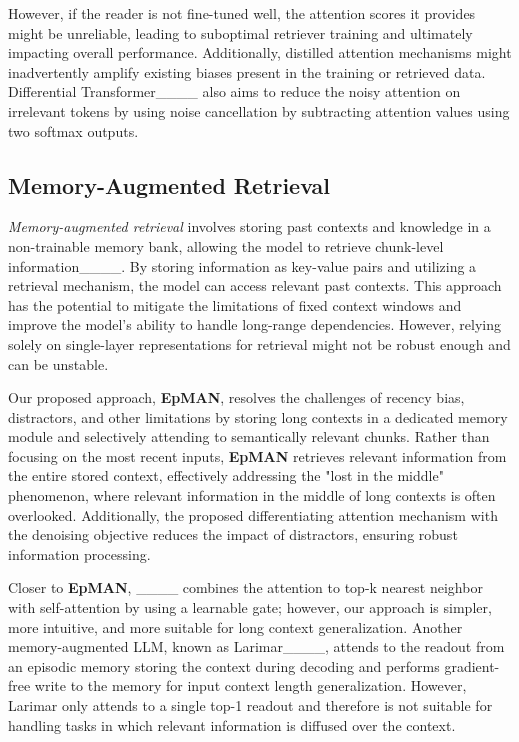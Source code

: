 However, if the reader is not fine-tuned well, the attention scores it provides might be unreliable, leading to suboptimal retriever training and ultimately impacting overall performance. Additionally, distilled attention mechanisms might inadvertently amplify existing biases present in the training or retrieved data. Differential Transformer____ also aims to reduce the noisy attention on irrelevant tokens by using noise cancellation by subtracting attention values using two softmax outputs.


\subsection{Memory-Augmented Retrieval}
\textit{Memory-augmented retrieval} involves storing past contexts and knowledge in a non-trainable memory bank, allowing the model to retrieve chunk-level information____. By storing information as key-value pairs and utilizing a retrieval mechanism, the model can access relevant past contexts. This approach has the potential to mitigate the limitations of fixed context windows and improve the model's ability to handle long-range dependencies. However, relying solely on single-layer representations for retrieval might not be robust enough and can be unstable. 


Our proposed approach, \textbf{EpMAN}, resolves the challenges of recency bias, distractors, and other limitations by storing long contexts in a dedicated memory module and selectively attending to semantically relevant chunks. Rather than focusing on the most recent inputs, \textbf{EpMAN} retrieves relevant information from the entire stored context, effectively addressing the "lost in the middle" phenomenon, where relevant information in the middle of long contexts is often overlooked. Additionally, the proposed differentiating attention mechanism with the denoising objective reduces the impact of distractors, ensuring robust information processing.

Closer to \textbf{EpMAN}, ____ combines the attention to top-k nearest neighbor with self-attention by using a learnable gate; however, our approach is simpler, more intuitive, and more suitable for long context generalization. Another memory-augmented LLM, known as Larimar____, attends to the readout from an episodic memory storing the context during decoding and 
performs gradient-free write to the memory for input context length generalization. However, Larimar only attends to a single top-1 readout and therefore is not suitable for handling tasks in which relevant information is diffused over the context.